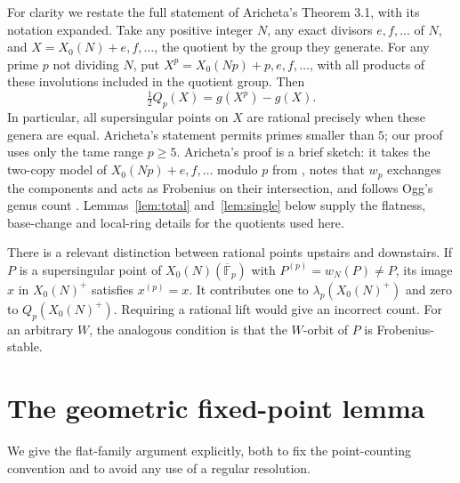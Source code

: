 \documentclass[11pt,a4paper]{article}
\theoremstyle{remark}\newtheorem{remark}[theorem]{Remark}
\numberwithin{equation}{section}
\newcommand{\kk}{\overline{\mathbb F}_p}
\begin{document}
For clarity we restate the full statement of Aricheta's Theorem 3.1, with its notation expanded. Take any positive integer $N$, any exact divisors $e,f,\ldots$ of $N$, and $X=X_0(N)+e,f,\ldots$, the quotient by the group they generate. For any prime $p$ not dividing $N$, put $X^p=X_0(Np)+p,e,f,\ldots$, with all products of these involutions included in the quotient group. Then
\begin{equation}\label{eq:aricheta}
\tfrac12Q_p(X)=g(X^p)-g(X).
\end{equation}
In particular, all supersingular points on $X$ are rational precisely when these genera are equal. Aricheta's statement permits primes smaller than $5$; our proof uses only the tame range $p\geq5$. Aricheta's proof is a brief sketch: it takes the two-copy model of $X_0(Np)+e,f,\ldots$ modulo $p$ from \cite[Section 5]{FH}, notes that $w_p$ exchanges the components and acts as Frobenius on their intersection, and follows Ogg's genus count \cite{OggRed}. Lemmas~\ref{lem:total} and~\ref{lem:single} below supply the flatness, base-change and local-ring details for the quotients used here.

There is a relevant distinction between rational points upstairs and downstairs. If $P$ is a supersingular point of $X_0(N)(\kk)$ with $P^{(p)}=w_N(P)\ne P$, its image $x$ in $X_0(N)^+$ satisfies $x^{(p)}=x$. It contributes one to $\lambda_p(X_0(N)^+)$ and zero to $Q_p(X_0(N)^+)$. Requiring a rational lift would give an incorrect count. For an arbitrary $W$, the analogous condition is that the $W$-orbit of $P$ is Frobenius-stable.

\section{The geometric fixed-point lemma}\label{sec:geometry}
We give the flat-family argument explicitly, both to fix the point-counting convention and to avoid any use of a regular resolution.
\end{document}
